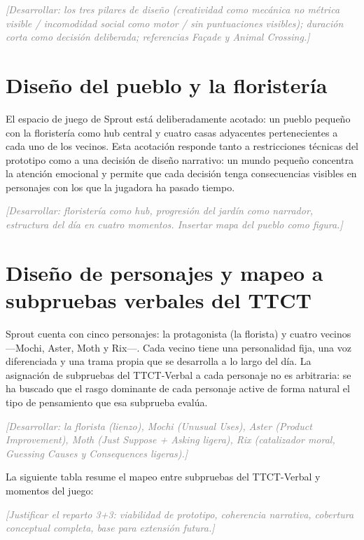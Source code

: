 \documentclass[12pt,twoside,titlepage]{report}
\begin{document}
\textcolor{gray}{\textit{[Desarrollar: los tres pilares de diseño (creatividad como mecánica no métrica visible / incomodidad social como motor / sin puntuaciones visibles); duración corta como decisión deliberada; referencias Façade y Animal Crossing.]}}

\section{Diseño del pueblo y la floristería}

El espacio de juego de Sprout está deliberadamente acotado: un pueblo pequeño con la floristería como hub central y cuatro casas adyacentes pertenecientes a cada uno de los vecinos. Esta acotación responde tanto a restricciones técnicas del prototipo como a una decisión de diseño narrativo: un mundo pequeño concentra la atención emocional y permite que cada decisión tenga consecuencias visibles en personajes con los que la jugadora ha pasado tiempo.

\textcolor{gray}{\textit{[Desarrollar: floristería como hub, progresión del jardín como narrador, estructura del día en cuatro momentos. Insertar mapa del pueblo como figura.]}}

\section{Diseño de personajes y mapeo a subpruebas verbales del TTCT}

Sprout cuenta con cinco personajes: la protagonista (la florista) y cuatro vecinos ---Mochi, Aster, Moth y Rix---. Cada vecino tiene una personalidad fija, una voz diferenciada y una trama propia que se desarrolla a lo largo del día. La asignación de subpruebas del TTCT-Verbal a cada personaje no es arbitraria: se ha buscado que el rasgo dominante de cada personaje active de forma natural el tipo de pensamiento que esa subprueba evalúa.

\textcolor{gray}{\textit{[Desarrollar: la florista (lienzo), Mochi (Unusual Uses), Aster (Product Improvement), Moth (Just Suppose + Asking ligera), Rix (catalizador moral, Guessing Causes y Consequences ligeras).]}}

La siguiente tabla resume el mapeo entre subpruebas del TTCT-Verbal y momentos del juego:

\textcolor{gray}{\textit{[Justificar el reparto 3+3: viabilidad de prototipo, coherencia narrativa, cobertura conceptual completa, base para extensión futura.]}}
\end{document}
